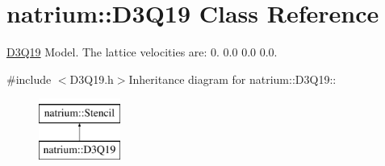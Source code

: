 \hypertarget{classnatrium_1_1D3Q19}{
\section{natrium::D3Q19 Class Reference}
\label{classnatrium_1_1D3Q19}
}


\hyperlink{classnatrium_1_1D3Q19}{D3Q19} Model. The lattice velocities are: 0. 0.0 0.0 0.0.  


{\ttfamily \#include $<$D3Q19.h$>$}Inheritance diagram for natrium::D3Q19::\begin{figure}[H]
\begin{center}
\leavevmode
\includegraphics[height=2cm]{classnatrium_1_1D3Q19}
\end{center}
\end{figure}
